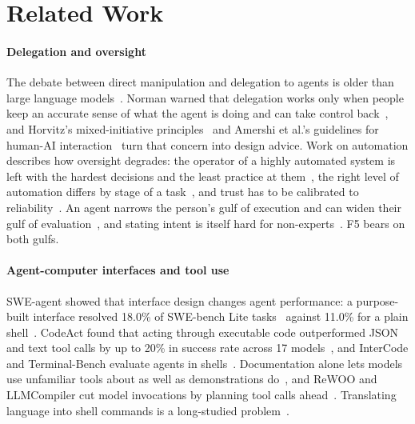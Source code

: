 \documentclass[sigconf,nonacm]{acmart}
\begin{document}
\section{Related Work}
\label{sec:related}

\paragraph{Delegation and oversight}
The debate between direct manipulation and delegation to agents is older than large language models~\cite{shneiderman1997direct,maes1994agents}. Norman warned that delegation works only when people keep an accurate sense of what the agent is doing and can take control back~\cite{norman1994agents}, and Horvitz's mixed-initiative principles~\cite{horvitz1999principles} and Amershi et al.'s guidelines for human-AI interaction~\cite{amershi2019guidelines} turn that concern into design advice. Work on automation describes how oversight degrades: the operator of a highly automated system is left with the hardest decisions and the least practice at them~\cite{bainbridge1983ironies}, the right level of automation differs by stage of a task~\cite{parasuraman2000model}, and trust has to be calibrated to reliability~\cite{lee2004trust}. An agent narrows the person's gulf of execution and can widen their gulf of evaluation~\cite{hutchins1985direct}, and stating intent is itself hard for non-experts~\cite{nielsen2023paradigm,zamfirescu2023johnny}. F5 bears on both gulfs.

\paragraph{Agent-computer interfaces and tool use}
SWE-agent showed that interface design changes agent performance: a purpose-built interface resolved 18.0\% of SWE-bench Lite tasks~\cite{jimenez2024swebench} against 11.0\% for a plain shell~\cite{yang2024sweagent}. CodeAct found that acting through executable code outperformed JSON and text tool calls by up to 20\% in success rate across 17 models~\cite{wang2024codeact}, and InterCode and Terminal-Bench evaluate agents in shells~\cite{yang2023intercode,merrill2026terminalbench}. Documentation alone lets models use unfamiliar tools about as well as demonstrations do~\cite{hsieh2023tooldoc}, and ReWOO and LLMCompiler cut model invocations by planning tool calls ahead~\cite{xu2023rewoo,kim2023llmcompiler}. Translating language into shell commands is a long-studied problem~\cite{lin2018nl2bash}.
\end{document}
